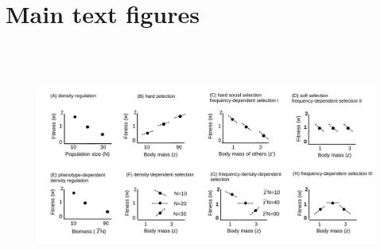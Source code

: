 \documentclass{article}
\begin{document}
	\newpage
	\renewcommand\tablename{Table } \let\nobreakspace\relax  	 \label{Table B2}
	
	
	\newpage
	\section{Main text figures}
	
	\begin{figure} [H]
	\renewcommand{\figurename}{Figure }
		\centering
		\includegraphics[width=15cm, height=8cm]{Figures/Fig2.pdf}

\end{figure}
\end{document}
